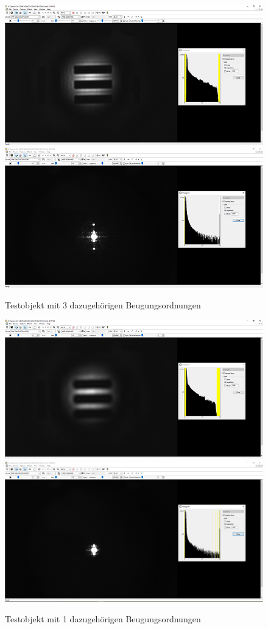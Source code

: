 \documentclass[12pt,a4paper,twoside]{article}
\begin{document}
\begin{figure}[H]
    \centering
    \includegraphics[width=0.45\linewidth]{nudes/AbbeTheorie/Aufgabe 2/horizontal/3te ohne.PNG}
    \includegraphics[width=0.45\linewidth]{nudes/AbbeTheorie/Aufgabe 2/horizontal/3te mit.PNG}
    \caption{Testobjekt mit 3 dazugehörigen Beugungsordnungen}
    \label{fig:Aufabe2-3O}
\end{figure}

\begin{figure}[H]
    \centering
    \includegraphics[width=0.45\linewidth]{nudes/AbbeTheorie/Aufgabe 2/horizontal/1te ohne.PNG}
    \includegraphics[width=0.45\linewidth]{nudes/AbbeTheorie/Aufgabe 2/horizontal/1te mit.PNG}
    \caption{Testobjekt mit 1 dazugehörigen Beugungsordnungen}
    \label{fig:Aufabe2-1O}
\end{figure}
\end{document}
